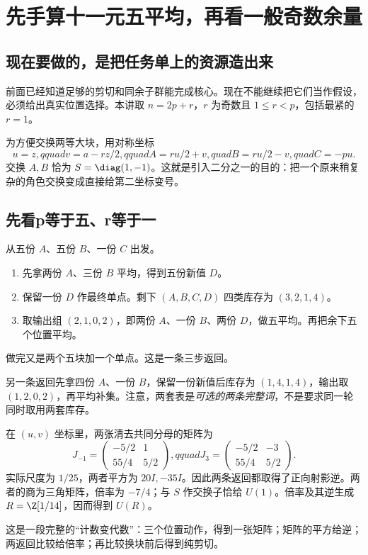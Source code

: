\chapter{先手算十一元五平均，再看一般奇数余量}\label{ch:odd}
\section{现在要做的，是把任务单上的资源造出来}
前面已经知道足够的剪切和同余子群能完成核心。现在不能继续把它们当作假设，必须给出真实位置选择。本讲取 $n=2p+r$，$r$ 为奇数且 $1\le r<p$，包括最紧的 $r=1$。

为方便交换两等大块，用对称坐标
\[u=z,qquad v=a-rz/2,qquad
A=ru/2+v,quad B=ru/2-v,quad C=-pu.
\]
交换 $A,B$ 恰为 $S=\diag(1,-1)$。这就是引入二分之一的目的：把一个原来稍复杂的角色交换变成直接给第二坐标变号。

\section{先看p等于五、r等于一}
从五份 $A$、五份 $B$、一份 $C$ 出发。
\begin{enumerate}
\item 先拿两份 $A$、三份 $B$ 平均，得到五份新值 $D$。
\item 保留一份 $D$ 作最终单点。剩下 $(A,B,C,D)$ 四类库存为 $(3,2,1,4)$。
\item 取输出组 $(2,1,0,2)$，即两份 $A$、一份 $B$、两份 $D$，做五平均。再把余下五个位置平均。
\end{enumerate}
做完又是两个五块加一个单点。这是一条三步返回。

另一条返回先拿四份 $A$、一份 $B$，保留一份新值后库存为 $(1,4,1,4)$，输出取 $(1,2,0,2)$，再平均补集。注意，两套表是\emph{可选的两条完整词}，不是要求同一轮同时取用两套库存。

在 $(u,v)$ 坐标里，两张清去共同分母的矩阵为
\[
J_{-1}=\begin{pmatrix}-5/2&1\\55/4&5/2\end{pmatrix},qquad
J_3=\begin{pmatrix}-5/2&-3\\55/4&5/2\end{pmatrix}.
\]
实际尺度为 $1/25$，两者平方为 $20I,-35I$。因此两条返回都取得了正向射影逆。两者的商为三角矩阵，倍率为 $-7/4$；与 $S$ 作交换子恰给 $U(1)$。倍率及其逆生成 $R=\Z[1/14]$，因而得到 $U(R)$。

这是一段完整的“计数变代数”：三个位置动作，得到一张矩阵；矩阵的平方给逆；两返回比较给倍率；再比较换块前后得到纯剪切。

